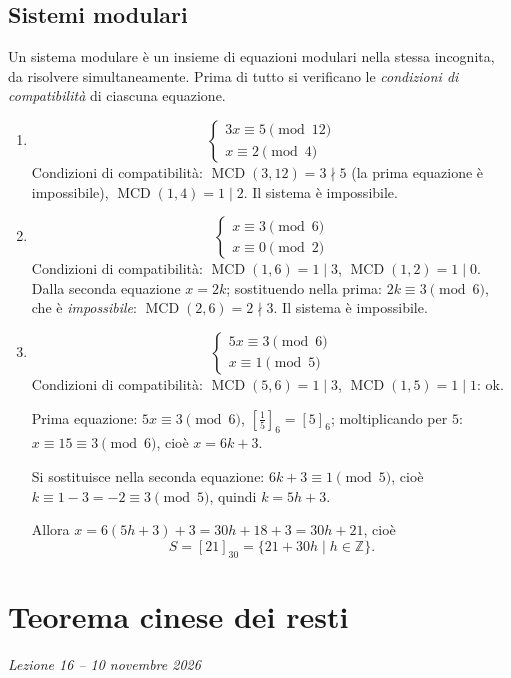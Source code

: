 \documentclass[11pt,a4paper]{article}
\begin{document}
\subsection{Sistemi modulari}

Un sistema modulare è un insieme di equazioni modulari nella stessa incognita, da risolvere simultaneamente. Prima di tutto si verificano le \emph{condizioni di compatibilità} di ciascuna equazione.

\begin{esempio}
\begin{enumerate}
  \item
  \[
    \begin{cases} 3x \equiv 5 \pmod{12} \\ x \equiv 2 \pmod 4 \end{cases}
  \]
  Condizioni di compatibilità: $\operatorname{MCD}(3, 12) = 3 \nmid 5$ (la prima equazione è impossibile), $\operatorname{MCD}(1, 4) = 1 \mid 2$. Il sistema è impossibile.
  \item
  \[
    \begin{cases} x \equiv 3 \pmod 6 \\ x \equiv 0 \pmod 2 \end{cases}
  \]
  Condizioni di compatibilità: $\operatorname{MCD}(1, 6) = 1 \mid 3$, $\operatorname{MCD}(1, 2) = 1 \mid 0$. Dalla seconda equazione $x = 2k$; sostituendo nella prima: $2k \equiv 3 \pmod 6$, che è \emph{impossibile}: $\operatorname{MCD}(2, 6) = 2 \nmid 3$. Il sistema è impossibile.
  \item
  \[
    \begin{cases} 5x \equiv 3 \pmod 6 \\ x \equiv 1 \pmod 5 \end{cases}
  \]
  Condizioni di compatibilità: $\operatorname{MCD}(5, 6) = 1 \mid 3$, $\operatorname{MCD}(1, 5) = 1 \mid 1$: ok.

  Prima equazione: $5x \equiv 3 \pmod 6$, $\left[\tfrac{1}{5}\right]_6 = [5]_6$; moltiplicando per $5$: $x \equiv 15 \equiv 3 \pmod 6$, cioè $x = 6k + 3$.

  Si sostituisce nella seconda equazione: $6k + 3 \equiv 1 \pmod 5$, cioè $k \equiv 1 - 3 = -2 \equiv 3 \pmod 5$, quindi $k = 5h + 3$.

  Allora $x = 6(5h + 3) + 3 = 30h + 18 + 3 = 30h + 21$, cioè
  \[
    S = [21]_{30} = \{21 + 30h \mid h \in \mathbb{Z}\}.
  \]
\end{enumerate}
\end{esempio}

\section[Teorema cinese dei resti (Lezione 16 -- 10 novembre 2026)]{Teorema cinese dei resti}
\noindent\emph{Lezione 16 -- 10 novembre 2026}
\end{document}

